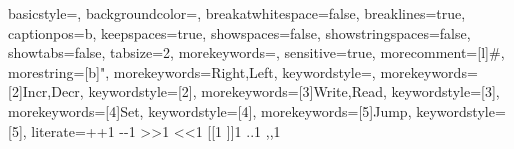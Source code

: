 \usepackage{listings}
\usepackage{xcolor}



{
  basicstyle=\ttfamily\linespread{1.15}\footnotesize\color{bfcomment},
  backgroundcolor=\color{bfbackground},
  breakatwhitespace=false,
  breaklines=true,
  captionpos=b,
  keepspaces=true,
  showspaces=false,
  showstringspaces=false,
  showtabs=false,
  tabsize=2,
  morekeywords={},
  sensitive=true,
  morecomment=[l]{\#},
  morestring=[b]",
  morekeywords={Right,Left},
  keywordstyle=\color{bfrightleft},
  morekeywords=[2]{Incr,Decr},
  keywordstyle=[2]\color{bfincrdecr},
  morekeywords=[3]{Write,Read},
  keywordstyle=[3]\color{bfio},
  morekeywords=[4]{Set},
  keywordstyle=[4]\color{bfset},
  morekeywords=[5]{Jump},
  keywordstyle=[5]\color{bfloop},
  literate={+}{{{\color{bfincrdecr}+}}}1
           {-}{{{\color{bfincrdecr}-}}}1
           {>}{{{\color{bfrightleft}>}}}1
           {<}{{{\color{bfrightleft}<}}}1
           {[}{{{\color{bfloop}[}}}1
           {]}{{{\color{bfloop}]}}}1
           {.}{{{\color{bfio}.}}}1
           {,}{{{\color{bfio},}}}1
}
